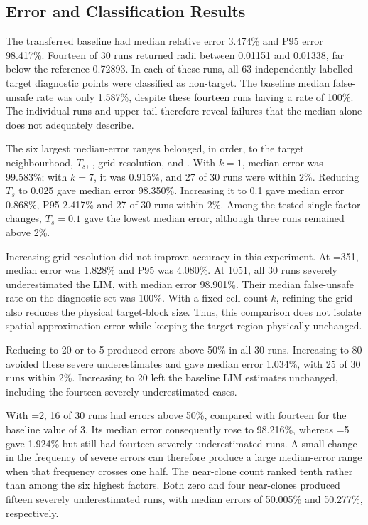 

\subsection{Error and Classification Results}
\begin{revision}
The transferred baseline had median relative error 3.474\% and P95 error 98.417\%. Fourteen of 30 runs returned radii between 0.01151 and 0.01338, far below the reference 0.72893. In each of these runs, all 63 independently labelled target diagnostic points were classified as non-target. The baseline median false-unsafe rate was only 1.587\%, despite these fourteen runs having a rate of 100\%. The individual runs and upper tail therefore reveal failures that the median alone does not adequately describe.

The six largest median-error ranges belonged, in order, to the target neighbourhood, $T_s$, , grid resolution,  and . With $k=1$, median error was 99.583\%; with $k=7$, it was 0.915\%, and 27 of 30 runs were within 2\%. Reducing $T_s$ to 0.025 gave median error 98.350\%. Increasing it to 0.1 gave median error 0.868\%, P95 2.417\% and 27 of 30 runs within 2\%. Among the tested single-factor changes, $T_s=0.1$ gave the lowest median error, although three runs remained above 2\%.

Increasing grid resolution did not improve accuracy in this experiment. At =351, median error was 1.828\% and P95 was 4.080\%. At 1051, all 30 runs severely underestimated the LIM, with median error 98.901\%. Their median false-unsafe rate on the diagnostic set was 100\%. With a fixed cell count $k$, refining the grid also reduces the physical target-block size. Thus, this comparison does not isolate spatial approximation error while keeping the target region physically unchanged.

Reducing  to 20 or  to 5 produced errors above 50\% in all 30 runs. Increasing  to 80 avoided these severe underestimates and gave median error 1.034\%, with 25 of 30 runs within 2\%. Increasing  to 20 left the baseline LIM estimates unchanged, including the fourteen severely underestimated cases.

With =2, 16 of 30 runs had errors above 50\%, compared with fourteen for the baseline value of 3. Its median error consequently rose to 98.216\%, whereas =5 gave 1.924\% but still had fourteen severely underestimated runs. A small change in the frequency of severe errors can therefore produce a large median-error range when that frequency crosses one half. The near-clone count ranked tenth rather than among the six highest factors. Both zero and four near-clones produced fifteen severely underestimated runs, with median errors of 50.005\% and 50.277\%, respectively.


\end{revision}
